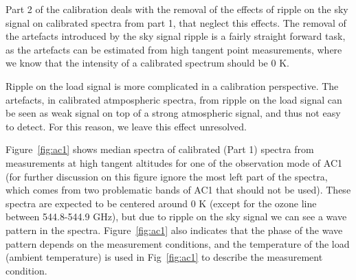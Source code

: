 \documentclass[12pt]{article}
\begin{document}
Part 2 of the calibration deals with the removal
of the effects of ripple on the sky signal on calibrated
spectra from part 1, that neglect this effects.
The removal of the artefacts introduced by the sky signal
ripple is a fairly straight forward task, as the artefacts
can be estimated from high tangent point measurements,
where we know that the intensity of a calibrated spectrum should be 0 K.

Ripple on the load signal is more complicated in 
a calibration perspective. The artefacts, in calibrated
atmpospheric spectra, from ripple on the
load signal can be seen as weak signal on top of a strong
atmospheric signal, and thus not easy to detect.
For this reason, we leave this effect unresolved.

Figure~\ref{fig:ac1} shows median spectra of calibrated (Part 1) spectra
from measurements at high tangent altitudes for one of the
observation mode of AC1 (for further discussion on this figure
ignore the most left part of the spectra, which comes from two 
problematic bands of AC1 that should not be used). 
These spectra are expected to be 
centered around 0 K (except for the ozone line between 544.8-544.9 GHz), 
but due to ripple on the sky signal we can see a wave pattern in the spectra.
Figure~\ref{fig:ac1} also indicates that the phase of the wave pattern
depends on the measurement conditions, and the temperature of
the load (ambient temperature) is used in Fig~\ref{fig:ac1}
to describe the measurement condition.
\end{document}

